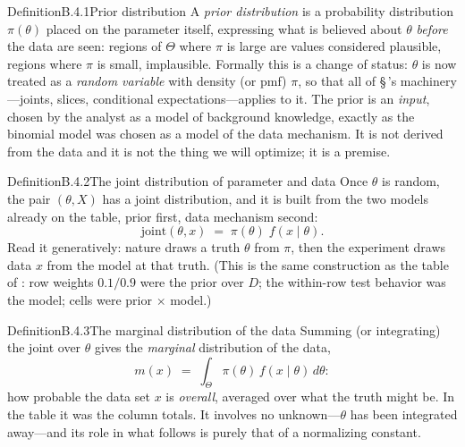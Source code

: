 \documentclass[main.tex]{subfiles}
\begin{document}

\begin{Obj}{Definition}{B.4.1}{Prior distribution}
A \emph{prior distribution} is a probability distribution $\pi(\theta)$ placed on the
parameter itself, expressing what is believed about $\theta$ \emph{before} the data are
seen: regions of $\Theta$ where $\pi$ is large are values considered plausible, regions
where $\pi$ is small, implausible. Formally this is a change of status: $\theta$ is now
treated as a \emph{random variable} with density (or pmf) $\pi$, so that all of
\S\,'s machinery---joints, slices, conditional expectations---applies to it. The
prior is an \emph{input}, chosen by the analyst as a model of background knowledge, exactly
as the binomial model was chosen as a model of the data mechanism. It is not derived from
the data and it is not the thing we will optimize; it is a premise.
\end{Obj}

\begin{Obj}{Definition}{B.4.2}{The joint distribution of parameter and data}
Once $\theta$ is random, the pair $(\theta, X)$ has a joint distribution, and it is built
from the two models already on the table, prior first, data mechanism second:
\[ \text{joint}(\theta, x) \;=\; \pi(\theta)\; f(x \mid \theta) . \]
Read it generatively: nature draws a truth $\theta$ from $\pi$, then the experiment draws
data $x$ from the model at that truth. (This is the same construction as the table of
: row weights $0.1/0.9$ were the prior over $D$; the within-row test behavior
was the model; cells were prior $\times$ model.)
\end{Obj}

\begin{Obj}{Definition}{B.4.3}{The marginal distribution of the data}
Summing (or integrating) the joint over $\theta$ gives the \emph{marginal} distribution of
the data,
\[ m(x) \;=\; \int_{\Theta} \pi(\theta)\, f(x\mid\theta)\, d\theta : \]
how probable the data set $x$ is \emph{overall}, averaged over what the truth might be. In
the table it was the column totals. It involves no unknown---$\theta$ has been integrated
away---and its role in what follows is purely that of a normalizing constant.
\end{Obj}
\end{document}
